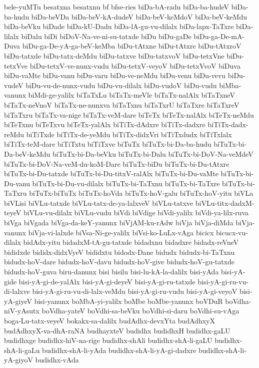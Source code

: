 {bele-yuMTu
besatxna
besatxnu
bf
bfse-ries
biDa-bA-radu
biDa-ba-hudeV
biDa-ba-hudu
biDa-beVDa
biDa-beV-kA-dudeV
biDa-beV-keMdoV
biDa-beV-keMdu
biDa-beVku
biDade
biDa-kU-Dadu
biDa-lA-gu-vu-dilalx
biDa-lapx-TaTxre
biDa-lilalx
biDalu
biDi
biDoV-Na-ve-ni-su-tatxde
biDu
biDu-gaDe
biDu-ga-De-mA-Duva
biDu-ga-De-yA-ga-beV-keMba
biDu-tAtxne
biDu-tAtxre
biDu-tAtxroV
biDu-tatxde
biDu-tatx-deMdu
biDu-tatxve
biDu-tatxvoV
biDu-tetxVne
biDu-tetxVve
biDu-tetxV-ve-nunx-vudu
biDu-tetxV-veyoV
biDu-tetxVvoV
biDuva
biDu-vaMte
biDu-vanu
biDu-varu
biDu-ve-neMdu
biDu-venu
biDu-vevu
biDu-vudeV
biDu-vu-de-nunx-vudu
biDu-vu-dilalx
biDu-vudoV
biDu-vudu
biMba-vanunx
biMdi-ge-yalilx
biTaTxLu
biTaTx-meVle
biTaTx-nalAlx
biTaTxneV
biTaTx-neVnoV
biTaTx-ne-nunxva
biTaTxnu
biTaTxrU
biTaTxre
biTaTxreV
biTaTxru
biTaTx-va-nige
biTaTx-veM-dare
biTeTx
biTeTx-nalAlx
biTeTx-neMdu
biTeTxnu
biTeTxvu
biTeTx-yalAlx
biTiTx-dAdxre
biTiTx-dadxre
biTiTx-dadx-reMdu
biTiTxde
biTiTx-de-yeMdu
biTiTx-didxVri
biTiTxdudx
biTiTxlalx
biTiTx-teM-dare
biTiTxtu
biTiTxve
biTuTx
biTuTx-bi-Da-ba-hudu
biTuTx-bi-Da-beV-keMdu
biTuTx-bi-Da-beVku
biTuTx-bi-Dalu
biTuTx-bi-DoV-Na-veMdeV
biTuTx-bi-DoV-Na-veM-du-koM-Dare
biTuTx-biDu
biTuTx-bi-Du-tAtxre
biTuTx-bi-Du-tatxde
biTuTx-bi-Du-titxV-ralAlx
biTuTx-bi-Du-vaMte
biTuTx-bi-Du-vanu
biTuTx-bi-Du-vu-dilalx
biTuTx-bi-TaTxnu
biTuTx-bi-TaTxre
biTuTx-bi-TaTxru
biTuTx-biTuTx
biTuTx-hoVda
biTuTx-hoV-galu
biTuTx-hoV-yitu
biVLa
biVLisi
biVLu-tatxde
biVLu-tatx-de-ya-lalxveV
biVLu-tatxve
biVLu-titx-dadxM-teyeV
biVLu-vu-dilalx
biVLu-vudu
biVdi
biVdige
biVdi-yalilx
biVdi-ya-lilx-ruva
biVga
biVgada
biVga-da-keY-yanunx
biVjAM-ku-rAdw
biVja
biVja-diMda
biVja-vanunx
biVja-vi-lalxde
biVsa-Ni-ge-yalilx
biVsi-ko-LuLx-vAga
bicicx
bicucx-vu-dilalx
bidAdx-yitu
bidadxM-tA-gu-tatxde
bidadxnu
bidadxre
bidadx-reVneV
bididxde
bididx-didxVyeV
bididxtu
bidodx-Dane
bidudx
bidudx-bi-TaTxnu
bidudx-hoV-dare
bidudx-hoV-davu
bidudx-hoV-give
bidudx-hoV-gu-tatxde
bidudx-hoV-guva
biru-danunx
bisi
bisilu
bisi-lu-kA-la-dalilx
bisi-yAda
bisi-yA-gide
bisi-yA-gi-de-yalAlx
bisi-yA-gi-deyeV
bisi-yA-gi-ru-tatxde
bisi-yA-gi-ru-vu-di-lalxve
bisi-yA-gi-ru-vu-di-lalx-veMdu
bisi-yA-gi-ru-vudu
bisi-yA-gi-veyoV
bisi-yA-giyeV
bisi-yanunx
boMbA-yi-yalilx
boMbe
boMbe-yanunx
boVDuR
boVdha-niV-yAsutx
boVdha-yateV
boVdhi-sa-beVku
boVdhi-si-daru
boVdhi-su-vAga
boga-Lu-tatx-veyeV
bokakx-sa-dalilx
budAdhx-devxYta
budAdhxyX
budAdhxyX-va-dhA-raNA
budhayxteV
budidhx
budidhxH
budidhx-gaLU
budidhxge
budidhx-hiV-na-rige
budidhx-shAli
budidhx-shA-li-gaLU
budidhx-shA-li-gaLu
budidhx-shA-li-yAda
budidhx-shA-li-yA-gi-dadxre
budidhx-shA-li-yA-giyoV
budidhx-vAda
}
